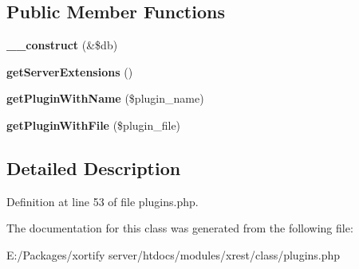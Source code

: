 \subsection*{Public Member Functions}
\begin{DoxyCompactItemize}
\item 
\hypertarget{class_xrest_plugins_handler_aaf2ef772755ec6f361d44e16cc9ffd69}{{\bfseries \-\_\-\-\_\-construct} (\&\$db)}\label{class_xrest_plugins_handler_aaf2ef772755ec6f361d44e16cc9ffd69}

\item 
\hypertarget{class_xrest_plugins_handler_a7a36f619f5d8e09c7cfdb7c221f93f26}{{\bfseries get\-Server\-Extensions} ()}\label{class_xrest_plugins_handler_a7a36f619f5d8e09c7cfdb7c221f93f26}

\item 
\hypertarget{class_xrest_plugins_handler_a3e0a6993690077018c8998c527e49a4e}{{\bfseries get\-Plugin\-With\-Name} (\$plugin\-\_\-name)}\label{class_xrest_plugins_handler_a3e0a6993690077018c8998c527e49a4e}

\item 
\hypertarget{class_xrest_plugins_handler_a381c3bea8bb3289c9a26226257bad677}{{\bfseries get\-Plugin\-With\-File} (\$plugin\-\_\-file)}\label{class_xrest_plugins_handler_a381c3bea8bb3289c9a26226257bad677}

\end{DoxyCompactItemize}


\subsection{Detailed Description}


Definition at line 53 of file plugins.\-php.



The documentation for this class was generated from the following file\-:\begin{DoxyCompactItemize}
\item 
E\-:/\-Packages/xortify server/htdocs/modules/xrest/class/plugins.\-php\end{DoxyCompactItemize}
